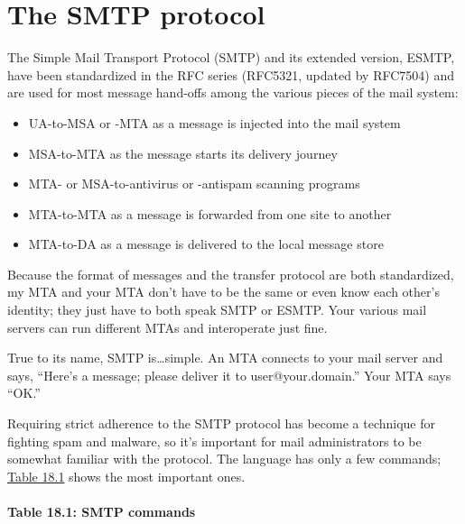 \section{The SMTP protocol}

The
\protect\hypertarget{part0026_split_009.htmlux5cux23_idIndexMarker2429}{}{}Simple
Mail Transport Protocol (SMTP) and its extended version,
\protect\hypertarget{part0026_split_009.htmlux5cux23_idIndexMarker2430}{}{}ESMTP,
have been standardized in the RFC series (RFC5321, updated by RFC7504)
and are used for most message hand-offs among the various pieces of the
mail system:

\begin{itemize}
\tightlist
\item
  UA-to-MSA or -MTA as a message is injected into the mail system
\item
  MSA-to-MTA as the message starts its delivery journey
\item
  MTA- or MSA-to-antivirus or -antispam scanning programs
\item
  MTA-to-MTA as a message is forwarded from one site to another
\item
  MTA-to-DA as a message is delivered to the local message store
\end{itemize}

Because the format of messages and the transfer protocol are both
standardized, my MTA and your MTA don't have to be the same or even know
each other's identity; they just have to both speak SMTP or ESMTP. Your
various mail servers can run different MTAs and interoperate just fine.

True to its name, SMTP is\ldots simple. An MTA connects to your mail
server and says, ``Here's a message; please deliver it to
user@your.domain.'' Your MTA says ``OK.''

Requiring strict adherence to the SMTP protocol has become a technique
for fighting spam and malware, so it's important for mail administrators
to be somewhat familiar with the protocol. The language has only a few
commands;
\protect\hyperlink{part0026_split_009.htmlux5cux23_idTextAnchor1012}{Table
18.1} shows the most important ones.

\paragraph[{Table 18.1: }SMTP commands]{\texorpdfstring{{Table 18.1:
}\protect\hypertarget{part0026_split_009.htmlux5cux23_idIndexMarker2431}{}{}\protect\hypertarget{part0026_split_009.htmlux5cux23_idTextAnchor1012}{}{}\protect\hypertarget{part0026_split_009.htmlux5cux23_idTextAnchor1013}{}{}SMTP
commands}{Table 18.1: SMTP commands}}

